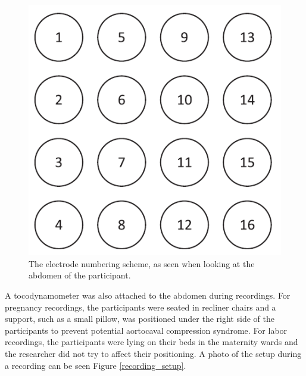 \documentclass[bioengineering,article,submit,moreauthors,pdftex,10pt,a4paper]{mdpi}
\begin{document}
\begin{figure}[H]
	\caption{\label{electrode_scheme} The electrode numbering scheme, as seen when looking at the abdomen of the participant.}
	\begin{center}
		\includegraphics[scale=0.7]{imagens/electrode_scheme.png} 		
	\end{center}
\end{figure}


A tocodynamometer was also attached to the abdomen during recordings. For pregnancy recordings, the participants were seated in recliner chairs and a support, such as a small pillow, was positioned under the right side of the participants to prevent potential aortocaval compression syndrome. For labor recordings, the participants were lying on their beds in the maternity wards and the researcher did not try to affect their positioning. A photo of the setup during a recording can be seen Figure \ref{recording_setup}.
\end{document}
